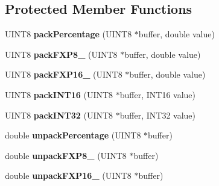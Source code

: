 \subsection*{\-Protected \-Member \-Functions}
\begin{DoxyCompactItemize}
\item 
\hypertarget{class_l_r_t_c_a_n_jaguar_a909efecae0b5afc309932f4c7a877aeb}{
\-U\-I\-N\-T8 {\bfseries pack\-Percentage} (\-U\-I\-N\-T8 $\ast$buffer, double value)}
\label{class_l_r_t_c_a_n_jaguar_a909efecae0b5afc309932f4c7a877aeb}

\item 
\hypertarget{class_l_r_t_c_a_n_jaguar_a812f09b796a779f7cd611ee7abc937d9}{
\-U\-I\-N\-T8 {\bfseries pack\-F\-X\-P8\-\_} (\-U\-I\-N\-T8 $\ast$buffer, double value)}
\label{class_l_r_t_c_a_n_jaguar_a812f09b796a779f7cd611ee7abc937d9}

\item 
\hypertarget{class_l_r_t_c_a_n_jaguar_a3eb539cc57719e57458e50be8da5e27d}{
\-U\-I\-N\-T8 {\bfseries pack\-F\-X\-P16\-\_} (\-U\-I\-N\-T8 $\ast$buffer, double value)}
\label{class_l_r_t_c_a_n_jaguar_a3eb539cc57719e57458e50be8da5e27d}

\item 
\hypertarget{class_l_r_t_c_a_n_jaguar_af2512a80bfbf41ae8484bff2f8a32259}{
\-U\-I\-N\-T8 {\bfseries pack\-I\-N\-T16} (\-U\-I\-N\-T8 $\ast$buffer, \-I\-N\-T16 value)}
\label{class_l_r_t_c_a_n_jaguar_af2512a80bfbf41ae8484bff2f8a32259}

\item 
\hypertarget{class_l_r_t_c_a_n_jaguar_aa96d27405894f2b054528d06c41562a3}{
\-U\-I\-N\-T8 {\bfseries pack\-I\-N\-T32} (\-U\-I\-N\-T8 $\ast$buffer, \-I\-N\-T32 value)}
\label{class_l_r_t_c_a_n_jaguar_aa96d27405894f2b054528d06c41562a3}

\item 
\hypertarget{class_l_r_t_c_a_n_jaguar_a079f35094879188bc62927b266f83e14}{
double {\bfseries unpack\-Percentage} (\-U\-I\-N\-T8 $\ast$buffer)}
\label{class_l_r_t_c_a_n_jaguar_a079f35094879188bc62927b266f83e14}

\item 
\hypertarget{class_l_r_t_c_a_n_jaguar_a439c73183db57d563513576c31f8b626}{
double {\bfseries unpack\-F\-X\-P8\-\_} (\-U\-I\-N\-T8 $\ast$buffer)}
\label{class_l_r_t_c_a_n_jaguar_a439c73183db57d563513576c31f8b626}

\item 
\hypertarget{class_l_r_t_c_a_n_jaguar_aea496aa1635749aad50e787d8181c12f}{
double {\bfseries unpack\-F\-X\-P16\-\_} (\-U\-I\-N\-T8 $\ast$buffer)}
\label{class_l_r_t_c_a_n_jaguar_aea496aa1635749aad50e787d8181c12f}


\end{DoxyCompactItemize}
